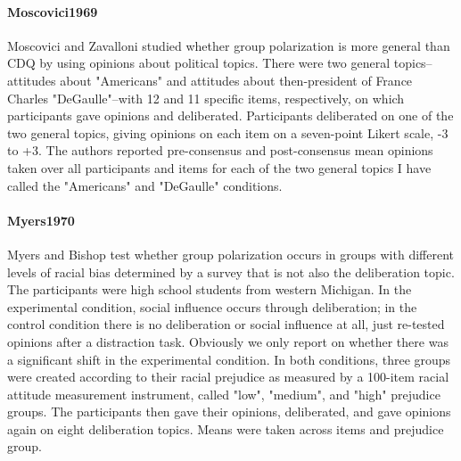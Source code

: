 \documentclass[11pt, letterpaper]{article}
\begin{document}
\paragraph{{Moscovici1969}} Moscovici and Zavalloni studied whether group
polarization is more general than CDQ by using opinions about political topics. There
were two general topics--attitudes about "Americans" and attitudes about then-president
of France Charles "DeGaulle"--with 12 and 11 specific items, respectively, on which
participants gave opinions and deliberated. Participants deliberated on one of the two
general topics, giving opinions on each item on a seven-point Likert scale, -3 to +3.
The authors reported pre-consensus and post-consensus mean opinions taken over all
participants and items for each of the two general topics I have called the "Americans"
and "DeGaulle" conditions.

\paragraph{{Myers1970}} Myers and Bishop test whether group polarization occurs
in groups with different levels of racial bias determined by a survey that is not also
the deliberation topic. The participants were high school students from western
Michigan. In the experimental condition, social influence occurs through deliberation;
in the control condition there is no deliberation or social influence at all, just
re-tested opinions after a distraction task. Obviously we only report on whether there
was a significant shift in the experimental condition. In both conditions, three groups
were created according to their racial prejudice as measured by a 100-item racial
attitude measurement instrument, called "low", "medium", and "high" prejudice groups.
The participants then gave their opinions, deliberated, and gave opinions again on
eight deliberation topics. Means were taken across items and prejudice group.
\end{document}
